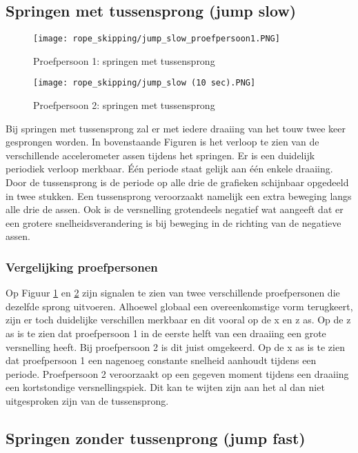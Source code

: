 \subsection{Springen met tussensprong (jump slow)} \label{jumpslow}

\begin{figure}[!htpd]
\centering
\caption{Proefpersoon 1: springen met tussensprong}\label{fig:jump_slow1}
\texttt{[image: rope\_skipping/jump\_slow\_proefpersoon1.PNG]}
\end{figure}

\begin{figure}[!htpd]
\centering
\caption{Proefpersoon 2: springen met tussensprong}\label{fig:jump_slow2}
\texttt{[image: rope\_skipping/jump\_slow (10 sec).PNG]}
\end{figure}

Bij springen met tussensprong zal er met iedere draaiing van het touw twee keer gesprongen worden.
In bovenstaande Figuren is het verloop te zien van de verschillende accelerometer assen tijdens het springen. Er is een duidelijk periodiek verloop merkbaar. Één periode staat gelijk aan één enkele draaiing. 
Door de tussensprong is de periode op alle drie de grafieken schijnbaar opgedeeld in twee stukken. Een tussensprong veroorzaakt namelijk een extra beweging langs alle drie de assen. 
Ook is de versnelling grotendeels negatief wat aangeeft dat er een grotere snelheidsverandering is bij beweging in de richting van de negatieve assen.

\subsubsection{Vergelijking proefpersonen}
Op Figuur \ref{fig:jump_slow1} en \ref{fig:jump_slow2} zijn signalen te zien van twee verschillende proefpersonen die dezelfde sprong uitvoeren. Alhoewel globaal een overeenkomstige vorm terugkeert, zijn er toch duidelijke verschillen merkbaar en dit vooral op de x en z as. Op de z as is te zien dat proefpersoon 1 in de eerste helft van een draaiing een grote versnelling heeft. Bij proefpersoon 2 is dit juist omgekeerd. Op de x as is te zien dat proefpersoon 1 een nagenoeg constante snelheid aanhoudt tijdens een periode. Proefpersoon 2 veroorzaakt op een gegeven moment tijdens een draaiing een kortstondige versnellingspiek. Dit kan te wijten zijn aan het al dan niet uitgesproken zijn van de tussensprong.

\subsection{Springen zonder tussenprong (jump fast)}

